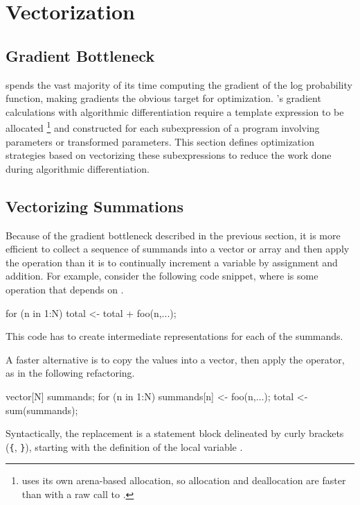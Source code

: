 \section{Vectorization}

\subsection{Gradient Bottleneck}

\Stan spends the vast majority of its time computing the gradient of
the log probability function, making gradients the obvious target for
optimization.  \Stan's gradient calculations with algorithmic
differentiation require a template expression to be allocated%
%
\footnote{\Stan uses its own arena-based allocation, so allocation and
  deallocation are faster than with a raw call to .}
%
and constructed for each subexpression of a \Stan program involving
parameters or transformed parameters.  This section defines
optimization strategies based on vectorizing these subexpressions to
reduce the work done during algorithmic differentiation.

\subsection{Vectorizing Summations}

Because of the gradient bottleneck described in the previous section,
it is more efficient to collect a sequence of summands into a vector
or array and then apply the  operation than it is to
continually increment a variable by assignment and addition.  For
example, consider the following code snippet, where  is
some operation that depends on .
%
\begin{stancode}
for (n in 1:N) 
  total <- total + foo(n,...);
\end{stancode}
%
This code has to create intermediate representations for each
of the  summands.  

A faster alternative is to copy the values into a vector, then
apply the  operator, as in the following refactoring.
%
\begin{stancode}
{  
  vector[N] summands;
  for (n in 1:N) 
    summands[n] <- foo(n,...);
  total <- sum(summands);
}
\end{stancode}
%
Syntactically, the replacement is a statement block delineated
by curly brackets (\Verb|{|, \Verb|}|), starting with the definition
of the local variable .

